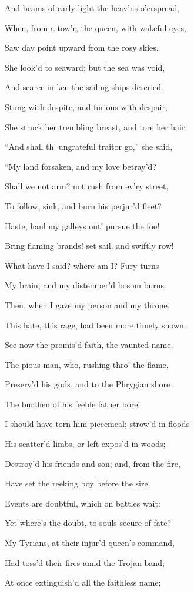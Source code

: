 And beams of early light the heav’ns o’erspread,

When, from a tow’r, the queen, with wakeful eyes,

Saw day point upward from the rosy skies.

She look’d to seaward; but the sea was void,

And scarce in ken the sailing ships descried.

Stung with despite, and furious with despair,

She struck her trembling breast, and tore her hair.

“And shall th’ ungrateful traitor go,” she said,

“My land forsaken, and my love betray’d?

Shall we not arm? not rush from ev’ry street,

To follow, sink, and burn his perjur’d fleet?

Haste, haul my galleys out! pursue the foe!

Bring flaming brands! set sail, and swiftly row!

What have I said? where am I? Fury turns

My brain; and my distemper’d bosom burns.

Then, when I gave my person and my throne,

This hate, this rage, had been more timely shown.

See now the promis’d faith, the vaunted name,

The pious man, who, rushing thro’ the flame,

Preserv’d his gods, and to the Phrygian shore

The burthen of his feeble father bore!

I should have torn him piecemeal; strow’d in floods

His scatter’d limbs, or left expos’d in woods;

Destroy’d his friends and son; and, from the fire,

Have set the reeking boy before the sire.

Events are doubtful, which on battles wait:

Yet where’s the doubt, to souls secure of fate?

My Tyrians, at their injur’d queen’s command,

Had toss’d their fires amid the Trojan band;

At once extinguish’d all the faithless name;

